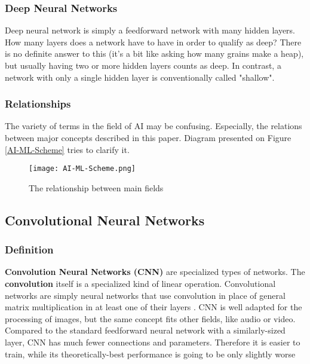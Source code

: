\documentclass[../Main.tex]{subfiles}
\begin{document}
    \subsubsection{Deep Neural Networks}
    Deep neural network is simply a feedforward network with many hidden layers. 
    How many layers does a network have to have in order to qualify as deep? There is no definite answer to this (it's a bit like asking how many grains make a heap), but usually having two or more hidden layers counts as deep. In contrast, a network with only a single hidden layer is conventionally called "shallow". 
    
\newpage

    \subsubsection{Relationships}
    The variety of terms in the field of AI may be confusing. Especially, the relations between major concepts described in this paper. Diagram presented on Figure \ref{AI-ML-Scheme} tries to clarify it.
    \\
    \begin{figure}[h!]
        \centering
        \texttt{[image: AI-ML-Scheme.png]}
        \caption{The relationship between main fields}
        \label{fig:AI-ML-Scheme}
    \end{figure}

\subsection{Convolutional Neural Networks}

    \subsubsection{Definition}
    \textbf{Convolution Neural Networks (CNN)} are specialized types of networks. The \textbf{convolution} itself is a specialized kind of linear operation. Convolutional networks are simply neural networks that use convolution in place of general matrix multiplication in at least one of their layers \cite{Goodfellow-et-al-2016}.  CNN is well adapted for the processing of images, but the same concept fits other fields, like audio or video. 
    Compared to the standard feedforward neural network with a similarly-sized layer, CNN has much fewer connections and parameters. Therefore it is easier to train, while its theoretically-best performance is going to be only slightly worse 
        
\end{document}
